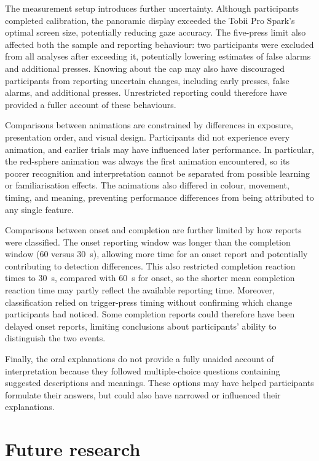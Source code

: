 \documentclass[
english,                 %
bibtex,                  %
includeExtraAbstracts, %
]{kththesis}
\numberwithin{listing}{chapter}
\begin{document}
The measurement setup introduces further uncertainty. Although participants completed calibration, the panoramic display exceeded the Tobii Pro Spark's optimal screen size, potentially reducing gaze accuracy. The five-press limit also affected both the sample and reporting behaviour: two participants were excluded from all analyses after exceeding it, potentially lowering estimates of false alarms and additional presses. Knowing about the cap may also have discouraged participants from reporting uncertain changes, including early presses, false alarms, and additional presses. Unrestricted reporting could therefore have provided a fuller account of these behaviours.

Comparisons between animations are constrained by differences in exposure, presentation order, and visual design. Participants did not experience every animation, and earlier trials may have influenced later performance. In particular, the red-sphere animation was always the first animation encountered, so its poorer recognition and interpretation cannot be separated from possible learning or familiarisation effects. The animations also differed in colour, movement, timing, and meaning, preventing performance differences from being attributed to any single feature.

Comparisons between onset and completion are further limited by how reports were classified. The onset reporting window was longer than the completion window (60 versus 30~s), allowing more time for an onset report and potentially contributing to detection differences. This also restricted completion reaction times to 30~s, compared with 60~s for onset, so the shorter mean completion reaction time may partly reflect the available reporting time. Moreover, classification relied on trigger-press timing without confirming which change participants had noticed. Some completion reports could therefore have been delayed onset reports, limiting conclusions about participants' ability to distinguish the two events.

Finally, the oral explanations do not provide a fully unaided account of interpretation because they followed multiple-choice questions containing suggested descriptions and meanings. These options may have helped participants formulate their answers, but could also have narrowed or influenced their explanations.

\section{Future research}
\label{sec:futureWork}
\end{document}
